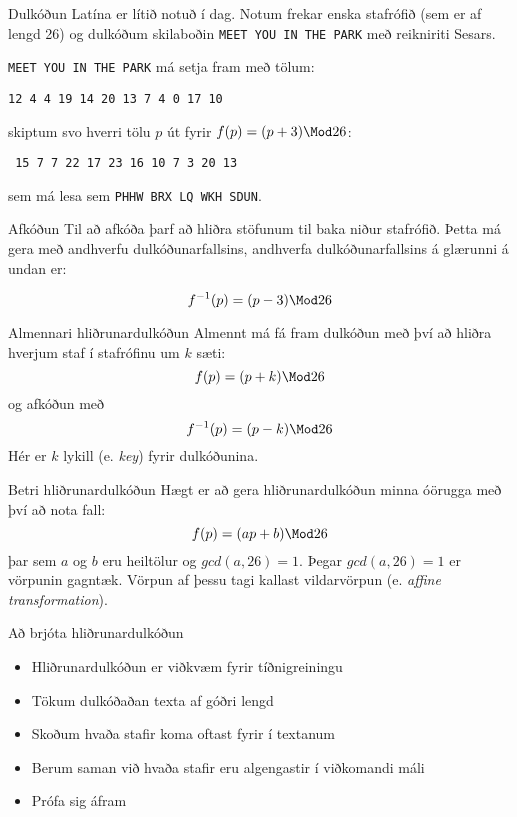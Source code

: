 \documentclass[handout]{beamer}
\begin{document}
\begin{frame}{Dulkóðun}
Latína er lítið notuð í dag. Notum frekar enska stafrófið (sem er af lengd 26) og dulkóðum skilaboðin \texttt{MEET YOU IN THE PARK} með reikniriti Sesars. \pause

\texttt{MEET YOU IN THE PARK} má setja fram með tölum:
\begin{center}
\texttt{12 4 4 19 14 20 13 7 4 0 17 10}
\end{center}\pause
skiptum svo hverri tölu $p$ út fyrir $f(p) = (p+3) \Mod 26$:
\begin{center}
\texttt{
15 7 7 22 17 23 16 10 7 3 20 13}
\end{center}
sem má lesa sem \texttt{PHHW BRX LQ WKH SDUN}.
\end{frame}

\begin{frame}{Afkóðun}
Til að afkóða þarf að hliðra stöfunum til baka niður stafrófið. Þetta má gera með andhverfu dulkóðunarfallsins, andhverfa dulkóðunarfallsins á glærunni á undan er:

\[
 f^{-1}(p) = (p-3)\Mod 26
\]
\end{frame}

\begin{frame}{Almennari hliðrunardulkóðun}
Almennt má fá fram dulkóðun með því að hliðra hverjum staf í stafrófinu um $k$ sæti:
\[
 f(p) = (p + k) \Mod 26
\]
og afkóðun með
\[
 f^{-1}(p) = (p - k) \Mod 26
\]
Hér er $k$ lykill (e. \emph{key}) fyrir dulkóðunina.
\end{frame}

\begin{frame}{Betri hliðrunardulkóðun}
Hægt er að gera hliðrunardulkóðun minna óörugga með því að nota fall:
\[
 f(p) = (ap + b)\Mod 26
\]
þar sem $a$ og $b$ eru heiltölur og $gcd(a,26) = 1$. Þegar $gcd(a,26) = 1$ er vörpunin gagntæk. Vörpun af þessu tagi kallast vildarvörpun (e. \emph{affine transformation}).
\end{frame}

\begin{frame}{Að brjóta hliðrunardulkóðun}
\begin{itemize}
 \item Hliðrunardulkóðun er viðkvæm fyrir tíðnigreiningu
 \item Tökum dulkóðaðan texta af góðri lengd
 \item Skoðum hvaða stafir koma oftast fyrir í textanum
 \item Berum saman við hvaða stafir eru algengastir í viðkomandi máli
 \item Prófa sig áfram
\end{itemize}
\end{frame}
\end{document}

